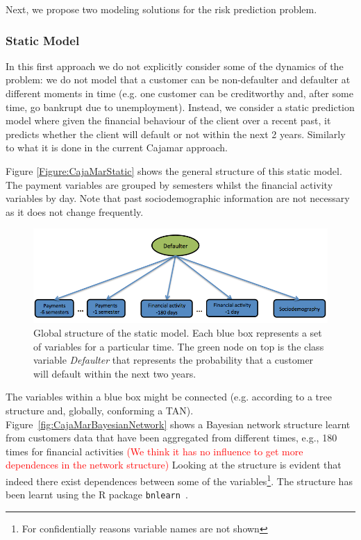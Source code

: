 Next, we propose two modeling solutions for the risk prediction problem.



\subsubsection*{Static Model} 

In this first approach we do not explicitly consider some of the dynamics of the problem: we do not model that a customer can be non-defaulter and defaulter at different moments in time (e.g. one customer can be creditworthy and, after some time, go bankrupt due to unemployment). Instead, we consider a static prediction model where given the financial behaviour of the client over a recent past, it predicts whether the client will default or not within the next 2 years. Similarly to what it is done in the current Cajamar approach. 

Figure \ref{Figure:CajaMarStatic} shows the general structure of this static model. The payment variables are grouped by semesters whilst the financial activity variables by day. Note that past sociodemographic information are not necessary as it does not change frequently.

\begin{figure}[htbp]
  \centering
\includegraphics[scale=0.5]{./figures/CajaMarModel0}
\caption{\label{Figure:CajaMarStatic}Global structure of the static model. Each blue box represents a set of variables for a particular time. The green node on top is the class variable \emph{Defaulter} that represents the probability that a customer will default within the next two years. } 
\label{fig:static}
\end{figure}

The variables within a blue box might be connected (e.g. according to a tree structure and, globally, conforming a TAN). Figure~\ref{fig:CajaMarBayesianNetwork} shows a Bayesian network structure learnt from customers data that have been aggregated from different times, e.g., 180 times for financial activities \textcolor{red}{(We think it has no influence to get more dependences in the network structure) }
Looking at the structure is evident that indeed there exist dependences between some of the variables\footnote{For confidentially reasons variable names are not shown}. The structure has been learnt using the R package \texttt{bnlearn}~\cite{Scu10, Nag13}.

